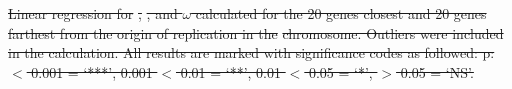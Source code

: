 \documentclass[11pt]{article}
\newcommand{\smel}{\textit{S.\,meliloti}\xspace}
\newcommand{\dn}{\textit{dN}\xspace}
\newcommand{\ds}{\textit{dS}\xspace}
\providecommand{\DIFdeltex}[1]{{\protect\color{red}\sout{#1}}}                      %
\providecommand{\DIFdelFL}[1]{\DIFdel{#1}} %
\providecommand{\DIFdelendFL}{} %
\providecommand{\DIFdel}[1]{\texorpdfstring{\DIFdeltex{#1}}{}} %
\begin{document}
\begin{table}[h]
{%
\DIFdelFL{Linear regression for }%
\DIFdelFL{, }%
\DIFdelFL{, and $\omega$ calculated for the 20 genes closest and 20 genes farthest from the origin of replication in the }%
\DIFdelFL{chromosome.  Outliers were included in the calculation. All results are marked with significance codes as followed: p: $<$ 0.001 = `***', 0.001 $<$ 0.01 = `**', 0.01 $<$ 0.05 = `*', $>$ 0.05 = `NS'.}}
\DIFdelendFL \end{table}


\newpage
\clearpage

\printbibliography[heading=bibintoc]
\end{document}
